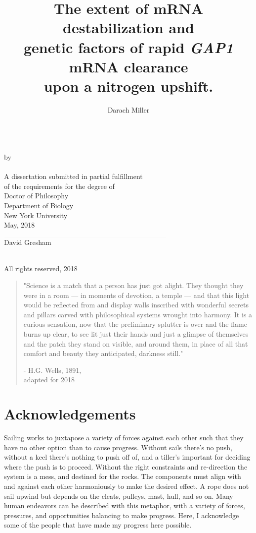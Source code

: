 \documentclass[12pt,letterpaper]{memoir}
\title{
The extent of mRNA destabilization and 
\\genetic factors of rapid \textit{GAP1} mRNA clearance 
\\upon a nitrogen upshift.
}
\author{Darach Miller}
\makeatletter
\def\makemytitle{
  \newpage
\begin{center}
\vfill
  \@title\\
\vfill
  by\\
\vfill
  \@author\\
\vfill
  A dissertation submitted in partial fulfillment \\
  of the requirements for the degree of \\
  Doctor of Philosophy \\
  Department of Biology \\
  New York University \\
  \monthz, \yearz\\
  \end{center}
\vfill
\begin{flushright}
  $\rule{3.25in}{0.01mm}$\\
  David Gresham
\end{flushright}
  \pagebreak
\begin{center}
  \textcopyright \hspace{0.2em} \@author \\
  All rights reserved, \yearz \\
\end{center}
  \pagebreak
}
\def\monthz{May}
\def\yearz{2018}
\makeatother
\begin{document}
\DoubleSpacing
\frontmatter
\pagestyle{empty}

\makemytitle

\iftrue
\begin{quote}
\SingleSpace
"Science is a match that a person has just got alight. 
They thought they were in a room --- 
in moments of devotion, a temple --- 
and that this light would be reflected from and display walls 
inscribed with wonderful secrets and pillars carved with 
philosophical systems wrought into harmony. 
\vfill
It is a curious sensation, now that the preliminary splutter is 
over and the flame burns up clear, to see lit just their hands and 
just a glimpse of themselves and the patch they stand on visible, and 
around them, in place of all that comfort and beauty they
anticipated, \vspace{0.5em} darkness still."

\hfill - H.G. Wells, 1891, \\\vspace{1em}\hfill adapted for 2018
\end{quote}
\fi

\newpage
\pagestyle{plain}

\section*{Acknowledgements}

\label{section:acknow}

Sailing works to juxtapose a variety of forces against 
each other such that they have no other option than to cause progress.
Without sails there's no push, without a keel there's nothing to push
off of, and a tiller's important for deciding where the push is to 
proceed.
Without the right constraints and re-direction the system is a 
mess, and destined for the rocks.
The components must align with and against each
other harmoniously to make the desired effect.
A rope does not sail upwind but depends on the cleats, pulleys,
mast, hull, and so on.
Many human endeavors can be described with 
this metaphor, with a variety of forces, pressures, and opportunities 
balancing to make progress.
Here, I acknowledge some of the people that have 
made my progress here possible.
\end{document}
